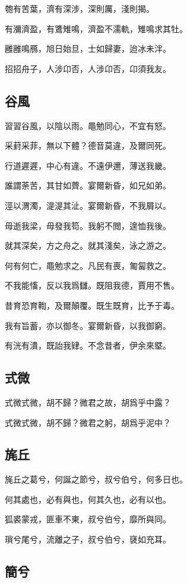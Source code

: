 匏有苦葉，濟有深涉，深則厲，淺則揭。

有瀰濟盈，有鷕雉鳴，濟盈不濡軌，雉鳴求其牡。

雝雝鳴鴈，旭日始旦，士如歸妻，迨冰未泮。

招招舟子，人涉卬否，人涉卬否，卬須我友。

\subsection[谷風]{谷風}

習習谷風，以陰以雨。黽勉同心，不宜有怒。

采葑采菲，無以下體？德音莫違，及爾同死。

行道遲遲，中心有違。不遠伊邇，薄送我畿。

誰謂荼苦，其甘如薺。宴爾新昏，如兄如弟。

涇以渭濁，湜湜其沚。宴爾新昏，不我屑以。

毋逝我梁，毋發我笱。我躬不閲，遑恤我後。

就其深矣，方之舟之。就其淺矣，泳之游之。

何有何亡，黽勉求之。凡民有喪，匍匐救之。

不我能慉，反以我爲讎。既阻我德，賈用不售。

昔育恐育鞫，及爾顛覆。既生既育，比予于毒。

我有旨蓄，亦以御冬。宴爾新昏，以我御窮。

有洸有潰，既詒我肄。不念昔者，伊余來塈。

\subsection[式微]{式微}

式微式微，胡不歸？微君之故，胡爲乎中露？

式微式微，胡不歸？微君之躬，胡爲乎泥中？

\subsection[旄丘]{旄丘}

旄丘之葛兮，何誕之節兮，叔兮伯兮，何多日也。

何其處也，必有與也，何其久也，必有以也。

狐裘蒙戎，匪車不東，叔兮伯兮，靡所與同。

瑣兮尾兮，流離之子，叔兮伯兮，褎如充耳。

\subsection[簡兮]{簡兮}

